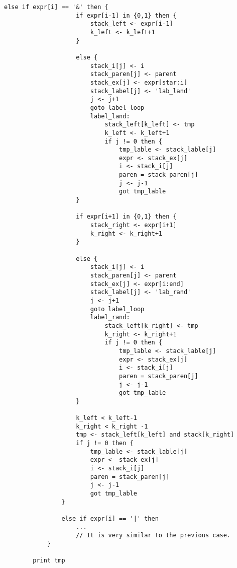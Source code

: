 \documentclass[a4papper]{article}
\theoremstyle{neosn}
\begin{document}
\begin{lstlisting}[label={lst:lstlisting2}]
                else if expr[i] == '&' then {
                    if expr[i-1] in {0,1} then {
                        stack_left <- expr[i-1]
                        k_left <- k_left+1
                    }

                    else {
                        stack_i[j] <- i
                        stack_paren[j] <- parent
                        stack_ex[j] <- expr[star:i]
                        stack_label[j] <- 'lab_land'
                        j <- j+1
                        goto label_loop
                        label_land:
                            stack_left[k_left] <- tmp
                            k_left <- k_left+1
                            if j != 0 then {
                                tmp_lable <- stack_lable[j]
                                expr <- stack_ex[j]
                                i <- stack_i[j]
                                paren = stack_paren[j]
                                j <- j-1
                                got tmp_lable
                    }

                    if expr[i+1] in {0,1} then {
                        stack_right <- expr[i+1]
                        k_right <- k_right+1
                    }

                    else {
                        stack_i[j] <- i
                        stack_paren[j] <- parent
                        stack_ex[j] <- expr[i:end]
                        stack_label[j] <- 'lab_rand'
                        j <- j+1
                        goto label_loop
                        label_rand:
                            stack_left[k_right] <- tmp
                            k_right <- k_right+1
                            if j != 0 then {
                                tmp_lable <- stack_lable[j]
                                expr <- stack_ex[j]
                                i <- stack_i[j]
                                paren = stack_paren[j]
                                j <- j-1
                                got tmp_lable
                    }

                    k_left < k_left-1
                    k_right < k_right -1
                    tmp <- stack_left[k_left] and stack[k_right]
                    if j != 0 then {
                        tmp_lable <- stack_lable[j]
                        expr <- stack_ex[j]
                        i <- stack_i[j]
                        paren = stack_paren[j]
                        j <- j-1
                        got tmp_lable
                }

                else if expr[i] == '|' then
                    ...
                    // It is very similar to the previous case.
            }

        print tmp

    \end{lstlisting}
\end{document}
